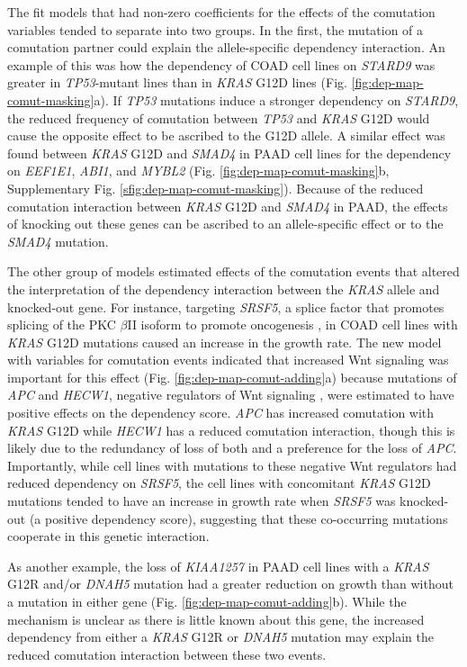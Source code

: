 \documentclass[english, 10pt, letterpaper]{article}
\newcommand{\KRAS}{\emph{KRAS}}
\begin{document}
The fit models that had non-zero coefficients for the effects of the comutation variables tended to separate into two groups.
In the first, the mutation of a comutation partner could explain the allele-specific dependency interaction.
An example of this was how the dependency of COAD cell lines on \emph{STARD9} was greater in \emph{TP53}-mutant lines than in \KRAS{} G12D lines (Fig. \ref{fig:dep-map-comut-masking}a).
If \emph{TP53} mutations induce a stronger dependency on \emph{STARD9}, the reduced frequency of comutation between \emph{TP53} and \KRAS{} G12D would cause the opposite effect to be ascribed to the G12D allele.
A similar effect was found between \KRAS{} G12D and \emph{SMAD4} in PAAD cell lines for the dependency on \emph{EEF1E1}, \emph{ABI1}, and \emph{MYBL2} (Fig. \ref{fig:dep-map-comut-masking}b, Supplementary Fig. \ref{sfig:dep-map-comut-masking}).
Because of the reduced comutation interaction between \KRAS{} G12D and \emph{SMAD4} in PAAD, the effects of knocking out these genes can be ascribed to an allele-specific effect or to the \emph{SMAD4} mutation.

The other group of models estimated effects of the comutation events that altered the interpretation of the dependency interaction between the \KRAS{} allele and knocked-out gene.
For instance, targeting \emph{SRSF5}, a splice factor that promotes splicing of the  PKC $\beta$II isoform to promote oncogenesis \cite{Gokmen-Polar2001ElevatedCarcinogenesis., Patel2005MolecularSRp40., Jiang2009Akt2Acid.}, in COAD cell lines with \KRAS{} G12D mutations caused an increase in the growth rate. 
The new model with variables for comutation events indicated that increased Wnt signaling was important for this effect (Fig. \ref{fig:dep-map-comut-adding}a) because mutations of \emph{APC} and \emph{HECW1}, negative regulators of Wnt signaling \cite{Zhan2017, Tauriello2010TheRegulation.}, were estimated to have positive effects on the dependency score.
\emph{APC} has increased comutation with \KRAS{} G12D while \emph{HECW1} has a reduced comutation interaction, though this is likely due to the redundancy of loss of both and a preference for the loss of \emph{APC}.
Importantly, while cell lines with mutations to these negative Wnt regulators had reduced dependency on \emph{SRSF5}, the cell lines with concomitant \KRAS{} G12D mutations tended to have an increase in growth rate when \emph{SRSF5} was knocked-out (a positive dependency score), suggesting that these co-occurring mutations cooperate in this genetic interaction.

As another example, the loss of \emph{KIAA1257} in PAAD cell lines with a \KRAS{} G12R and/or \emph{DNAH5} mutation had a greater reduction on growth than without a mutation in either gene (Fig. \ref{fig:dep-map-comut-adding}b).
While the mechanism is unclear as there is little known about this gene, the increased dependency from either a \KRAS{} G12R or \emph{DNAH5} mutation may explain the reduced comutation interaction between these two events.
\end{document}
